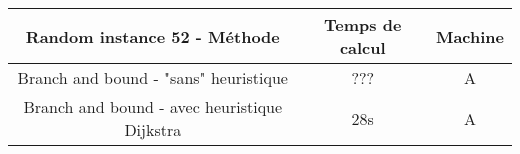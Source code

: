 \documentclass[french]{article}
\begin{document}
\begin{table}
	\begin{center}
		{\renewcommand{\arraystretch}{3}
		\begin{tabular}{|c|c|c|}
			\hline
			\textbf{Random instance 52 - Méthode} & \textbf{Temps de calcul} & \textbf{Machine}\\
			\hline
			Branch and bound - "sans" heuristique & ??? & A\\
			\hline
			Branch and bound - avec heuristique Dijkstra & 28s & A\\
			\hline
		\end{tabular}}
	\end{center}
\end{table}
\end{document}
